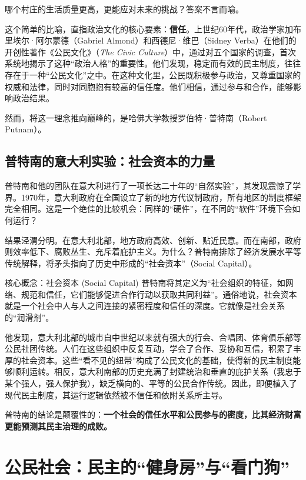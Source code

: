 \documentclass[a5paper, 11pt, openany]{ctexbook}
\begin{document}
哪个村庄的生活质量更高，更能应对未来的挑战？答案不言而喻。

这个简单的比喻，直指政治文化的核心要素：\textbf{信任}。上世纪60年代，政治学家加布里埃尔·阿尔蒙德（Gabriel Almond）和西德尼·维巴（Sidney Verba）在他们的开创性著作《公民文化》（\textit{The Civic Culture}）中，通过对五个国家的调查，首次系统地揭示了这种“政治人格”的重要性。他们发现，稳定而有效的民主制度，往往存在于一种“公民文化”之中。在这种文化里，公民既积极参与政治，又尊重国家的权威和法律，同时对同胞抱有较高的信任度。他们相信，通过参与和合作，能够影响政治结果。

然而，将这一理念推向巅峰的，是哈佛大学教授罗伯特·普特南（Robert Putnam）。

\subsection{普特南的意大利实验：社会资本的力量}

普特南和他的团队在意大利进行了一项长达二十年的“自然实验”，其发现震惊了学界。1970年，意大利政府在全国设立了新的地方代议制政府，所有地区的制度框架完全相同。这是一个绝佳的比较机会：同样的“硬件”，在不同的“软件”环境下会如何运行？

结果泾渭分明。在意大利北部，地方政府高效、创新、贴近民意。而在南部，政府则效率低下、腐败丛生、充斥着庇护主义。为什么？普特南排除了经济发展水平等传统解释，将矛头指向了历史中形成的“社会资本”（Social Capital）。

\begin{coreconcept}{核心概念：社会资本 (Social Capital)}
    普特南将其定义为“社会组织的特征，如网络、规范和信任，它们能够促进合作行动以获取共同利益”。通俗地说，社会资本就是一个社会中人与人之间连接的紧密程度和信任的深度。它就像是社会关系的“润滑剂”。
\end{coreconcept}

他发现，意大利北部的城市自中世纪以来就有强大的行会、合唱团、体育俱乐部等公民社团传统。人们在这些组织中反复互动，学会了合作、妥协和互信，积累了丰厚的社会资本。这些“看不见的纽带”构成了公民文化的基础，使得新的民主制度能够顺利运转。相反，意大利南部的历史充满了封建统治和垂直的庇护关系（我忠于某个强人，强人保护我），缺乏横向的、平等的公民合作传统。因此，即便植入了现代民主制度，其运行逻辑依然被不信任和依附关系所主导。

普特南的结论是颠覆性的：\textbf{一个社会的信任水平和公民参与的密度，比其经济财富更能预测其民主治理的成败。}

\section{公民社会：民主的“健身房”与“看门狗”}
\end{document}
